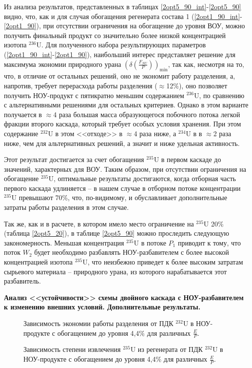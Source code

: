 Из анализа результатов, представленных в таблицах \ref{2opt5_90_int}-\ref{2opt5_90} видно, что, как и для случая обогащения регенерата состава 1 (\ref{2opt1_90_int}-\ref{2opt1_90}), при отсутствии ограничения на обогащение до уровня ВОУ, можно получить финальный продукт со значительно более низкой концентрацией изотопа $^{236}$U. Для полученного набора результирующих параметров (\ref{2opt1_90_int}-\ref{2opt1_90}), наибольший интерес представляет решение для максимума экономии природного урана $(\delta(\frac{F_{NU}}{P}))_\text{min}$, так как, несмотря на то, что, в отличие от остальных решений, оно не экономит работу разделения, а, напротив, требует перерасхода работы разделения ($\approx$12\%), оно позволяет получить НОУ-продукт с пятикратно меньшим содержанием $^{236}$U, по сравнению с альтернативными решениями для остальных критериев. Однако в этом варианте получается в $\approx$4 раза большая масса образующегося побочного потока легкой фракции второго каскада, который требует особых условия хранения. При этом содержание $^{232}$U в этом <<отходе>> в $\approx$4 раза ниже, а $^{234}$U в в $\approx$2 раза ниже, чем для альтернативных решений, а значит и ниже удельная активность.

Этот результат достигается за счет обогащения $^{235}$U в первом каскаде до значений, характерных для ВОУ. Таким образом, при отсутствии ограничения на обогащение $^{235}$U, оптимальные результаты достигаются, когда отборная часть первого каскада удлиняется -- в нашем случае в отборном потоке концентрации $^{235}$U превышают 70\%, что, по-видимому, и обуславливает дополнительные затраты работы разделения в этом случае.

Так же, как и в расчете, в котором имело место ограничение на $^{235}$U 20\% (таблица \ref{2opt5_20}), в таблице \ref{2opt5_90} можно проследить следующую закономерность. Меньшая концентрация $^{235}$U в потоке $P_{1}$ приводит к тому, что поток $W_{2}$ будет необходимо разбавлять НОУ-разбавителем с более высокой концентрацией изотопа $^{235}$U, что неизбежно приведет к более высоким затратам сырьевого материала -- природного урана, из которого нарабатывается этот разбавитель.


\textbf{Анализ <<устойчивости>> схемы двойного каскада с НОУ-разбавителем к изменению внешних условий. Дополнительные результаты.}


\begin{figure}
    \centering
    \begin{minipage}{.5\textwidth}
      \centering
      
      \caption{{Зависимость экономии работы разделения от ПДК $^{232}$U в НОУ-продукте с обогащением до уровня 4,4\% для различных $\frac{E}{P}$.{\label{sw44}}}}
    \end{minipage}%
    \begin{minipage}{.5\textwidth}
      \centering
      
      \caption{{Зависимость степени извлечения $^{235}$U из регенерата от ПДК $^{232}$U в НОУ-продукте с обогащением до уровня 4,4\% для различных $\frac{E}{P}$.{\label{exR44}}}}
    \end{minipage}
\end{figure}


